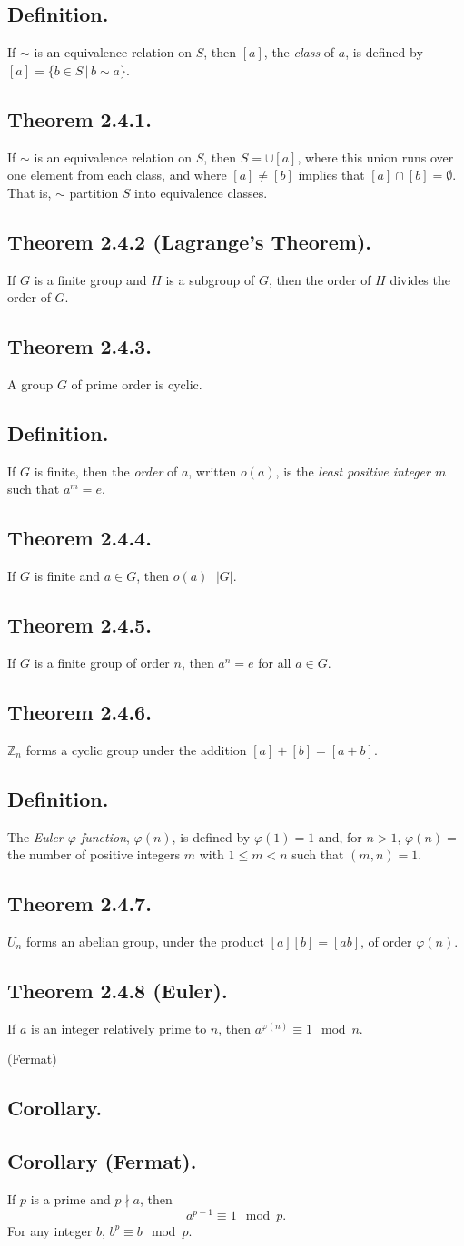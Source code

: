 \documentclass{article}
\newenvironment{thm}[1]{\subsection*{Theorem #1.}}{}
\newenvironment{defn}{\subsection*{Definition.}}{}
\newenvironment{corollary}[1]{
    \def\temp{#1}\ifx\temp\empty
        \subsection*{Corollary.}
    \else
        \subsection*{Corollary #1.}
    \fi
    
}{}
\newcommand*{\Z}{\mathbb{Z}}
\begin{document}
\begin{defn}
    If $\sim$ is an equivalence relation on $S$, then $[a]$, 
    the \textit{class} of $a$, is defined by $[a] = \{b \in S \, | \, b \sim a\}$.
\end{defn}

\begin{thm}{2.4.1}
    If $\sim$ is an equivalence relation on $S$, then $S = \cup[a]$,
    where this union runs over one element from each class, and where $[a] \neq [b]$
    implies that $[a] \cap [b] = \emptyset$. That is, $\sim$ partition $S$ into equivalence classes.
\end{thm}

\begin{thm}{2.4.2 (Lagrange's Theorem)}
    If $G$ is a finite group and $H$ is a subgroup of $G$, then the order of $H$ divides the order of $G$.
\end{thm}

\begin{thm}{2.4.3}
    A group $G$ of prime order is cyclic.
\end{thm}

\begin{defn}
    If $G$ is finite, then the \textit{order} of $a$, written $o(a)$, 
    is the \textit{least positive integer $m$} such that $a^m = e$.
\end{defn}

\begin{thm}{2.4.4}
    If $G$ is finite and $a \in G$, then $o(a) \, | \, |G|$.
\end{thm}

\begin{thm}{2.4.5}
    If $G$ is a finite group of order $n$, then $a^n = e$ for all $a \in G$.
\end{thm}

\begin{thm}{2.4.6}
    $\Z_n$ forms a cyclic group under the addition $[a] + [b] = [a + b]$.
\end{thm}

\begin{defn}
    The \textit{Euler $\varphi$-function}, $\varphi(n)$, is defined by $\varphi(1) = 1$ and,
    for $n > 1$, $\varphi(n) = $ the number of positive integers $m$ with $1 \leq m < n$ such that $(m, n) = 1$.
\end{defn}

\begin{thm}{2.4.7}
    $U_n$ forms an abelian group, under the product $[a][b] = [ab]$, of order $\varphi(n)$.
\end{thm}

\begin{thm}{2.4.8 (Euler)}
    If $a$ is an integer relatively prime to $n$, then $a^{\varphi(n)} \equiv 1 \mod n$.
\end{thm}

\begin{corollary}{(Fermat)}
    If $p$ is a prime and $p \nmid a$, then
    \[
        a^{p-1} \equiv 1 \mod p.
    \]
    For any integer $b$, $b^p \equiv b \mod p$.
\end{corollary}
 
\end{document}
